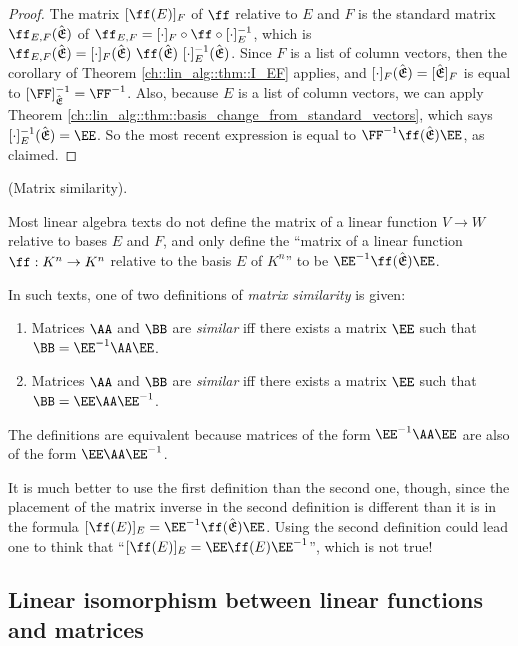 \begin{proof}
   The matrix $[\ff(E)]_F$ of $\ff$ relative to $E$ and $F$ is the standard matrix $\ff_{E,F}(\sE)$ of $\ff_{E,F} = [\cdot]_F \circ \ff \circ [\cdot]_E^{-1}$, which is $\ff_{E,F}(\sE) = [\cdot]_F(\sE) \spc \ff(\sE) \spc [\cdot]_E^{-1}(\sE)$. Since $F$ is a list of column vectors, then the corollary of Theorem \ref{ch::lin_alg::thm::I_EF} applies, and $[\cdot]_F({\hat{\mathfrak{E}}}) = [{\hat{\mathfrak{E}}}]_F$ is equal to $[\FF]_\sE^{-1} = \FF^{-1}$. Also, because $E$ is a list of column vectors, we can apply Theorem \ref{ch::lin_alg::thm::basis_change_from_standard_vectors}, which says $[\cdot]_E^{-1}(\sE) = \EE$. So the most recent expression is equal to $\FF^{-1} \ff(\sE) \EE$, as claimed.
\end{proof}

\begin{remark}
    (Matrix similarity).

    Most linear algebra texts do not define the matrix of a linear function $V \rightarrow W$ relative to bases $E$ and $F$, and only define the ``matrix of a linear function $\ff:K^n \rightarrow K^n$ relative to the basis $E$ of $K^n$'' to be $\EE^{-1} \ff(\sE) \EE$.

    In such texts, one of two definitions of \textit{matrix similarity} is given:

    \begin{enumerate}
        \item Matrices $\AA$ and $\BB$ are \textit{similar} iff there exists a matrix $\EE$ such that $\BB = \EE^{-1} \AA \EE$.
        \item Matrices $\AA$ and $\BB$ are \textit{similar} iff there exists a matrix $\EE$ such that $\BB = \EE \AA \EE^{-1}$.
    \end{enumerate}
    
    The definitions are equivalent because matrices of the form $\EE^{-1} \AA \EE$ are also of the form $\EE \AA \EE^{-1}$.
    
    It is much better to use the first definition than the second one, though, since the placement of the matrix inverse in the second definition is different than it is in the formula $[\ff(E)]_E = \EE^{-1} \ff(\sE) \EE$. Using the second definition could lead one to think that ``$[\ff(E)]_E = \EE \ff(E) \EE^{-1}$'', which is not true!
\end{remark}

\newpage

\subsection*{Linear isomorphism between linear functions and matrices}


